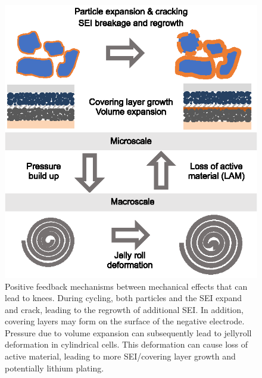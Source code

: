 \documentclass[journal=jpclcd,manuscript=article]{achemso}
\begin{document}
\begin{figure}[hp]
\centering
\includegraphics[scale = 1]{figures/mechanical.eps}
\caption{Positive feedback mechanisms between mechanical effects that can lead to knees. During cycling, both particles and the SEI expand and crack, leading to the regrowth of additional SEI. In addition, covering layers may form on the surface of the negative electrode. Pressure due to volume expansion can subsequently lead to jellyroll deformation in cylindrical cells. This deformation can cause loss of active material, leading to more SEI/covering layer growth and potentially lithium plating.}
\label{fig:knee_mechanical}
\end{figure}
\end{document}
